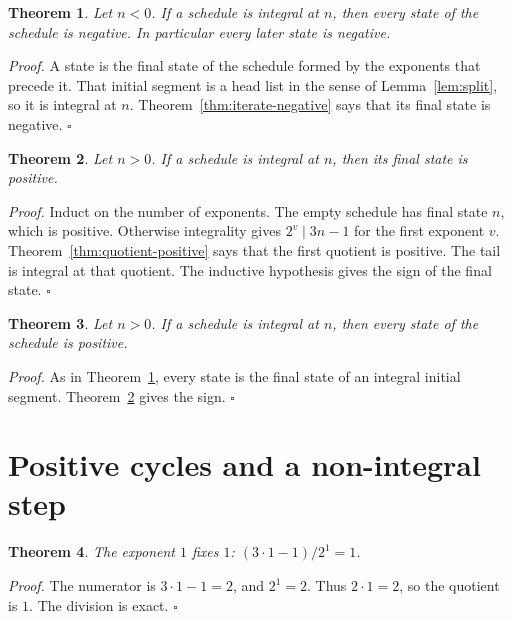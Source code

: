 \documentclass[11pt,letterpaper]{article}
\newtheorem{theorem}{Theorem}
\newenvironment{proof}{\noindent\textit{Proof.}}{\hfill\(\square\)}
\begin{document}
\begin{theorem}
\label{thm:later-negative}
Let \(n<0\). If a schedule is integral at \(n\), then every state of the schedule is negative. In particular every later state is negative.
\end{theorem}

\begin{proof}
A state is the final state of the schedule formed by the exponents that precede it. That initial segment is a head list in the sense of Lemma~\ref{lem:split}, so it is integral at \(n\). Theorem~\ref{thm:iterate-negative} says that its final state is negative.
\end{proof}

\begin{theorem}
\label{thm:iterate-positive}
Let \(n>0\). If a schedule is integral at \(n\), then its final state is positive.
\end{theorem}

\begin{proof}
Induct on the number of exponents. The empty schedule has final state \(n\), which is positive. Otherwise integrality gives \(2^v\mid 3n-1\) for the first exponent \(v\). Theorem~\ref{thm:quotient-positive} says that the first quotient is positive. The tail is integral at that quotient. The inductive hypothesis gives the sign of the final state.
\end{proof}

\begin{theorem}
\label{thm:later-positive}
Let \(n>0\). If a schedule is integral at \(n\), then every state of the schedule is positive.
\end{theorem}

\begin{proof}
As in Theorem~\ref{thm:later-negative}, every state is the final state of an integral initial segment. Theorem~\ref{thm:iterate-positive} gives the sign.
\end{proof}

\section{Positive cycles and a non-integral step}

\begin{theorem}
\label{thm:fixed-point}
The exponent \(1\) fixes \(1\): \((3\cdot 1-1)/2^{1}=1\).
\end{theorem}

\begin{proof}
The numerator is \(3\cdot 1-1=2\), and \(2^{1}=2\). Thus \(2\cdot 1=2\), so the quotient is \(1\). The division is exact.
\end{proof}
\end{document}
